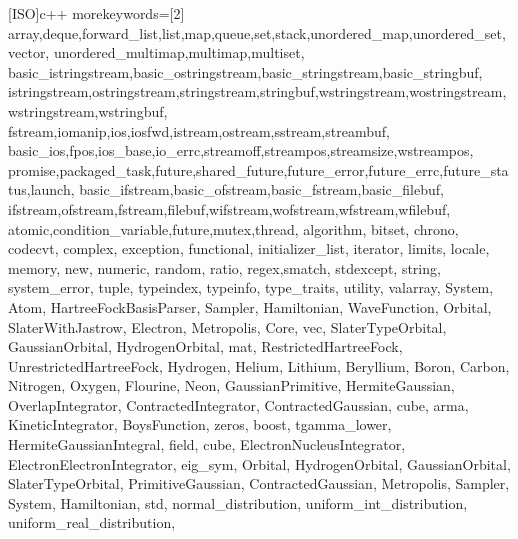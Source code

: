 [ISO]{c++}
{
    morekeywords=[2]{
        array,deque,forward_list,list,map,queue,set,stack,unordered_map,unordered_set,vector,
        unordered_multimap,multimap,multiset,
        basic_istringstream,basic_ostringstream,basic_stringstream,basic_stringbuf,
        istringstream,ostringstream,stringstream,stringbuf,wstringstream,wostringstream,wstringstream,wstringbuf,
        fstream,iomanip,ios,iosfwd,istream,ostream,sstream,streambuf,
        basic_ios,fpos,ios_base,io_errc,streamoff,streampos,streamsize,wstreampos,
        promise,packaged_task,future,shared_future,future_error,future_errc,future_status,launch,
        basic_ifstream,basic_ofstream,basic_fstream,basic_filebuf,
        ifstream,ofstream,fstream,filebuf,wifstream,wofstream,wfstream,wfilebuf,
        atomic,condition_variable,future,mutex,thread,
        algorithm,
        bitset,
        chrono,
        codecvt,
        complex,
        exception,
        functional,
        initializer_list,
        iterator,
        limits,
        locale,
        memory,
        new,
        numeric,
        random,
        ratio,
        regex,smatch,
        stdexcept,
        string,
        system_error,
        tuple,
        typeindex,
        typeinfo,
        type_traits,
        utility,
        valarray,
        System,
        Atom,
        HartreeFockBasisParser,
        Sampler,
        Hamiltonian,
        WaveFunction,
        Orbital,
        SlaterWithJastrow,
        Electron,
        Metropolis,
        Core,
        vec,
        SlaterTypeOrbital,
        GaussianOrbital,
        HydrogenOrbital,
        mat,
        RestrictedHartreeFock,
        UnrestrictedHartreeFock,
        Hydrogen,
        Helium,
        Lithium,
        Beryllium,
        Boron,
        Carbon,
        Nitrogen,
        Oxygen,
        Flourine,
        Neon,
        GaussianPrimitive,
        HermiteGaussian,
        OverlapIntegrator,
        ContractedIntegrator,
        ContractedGaussian,
        cube,
        arma,
        KineticIntegrator,
        BoysFunction,
        zeros,
        boost,
        tgamma_lower,
        HermiteGaussianIntegral,
        field,
        cube,
        ElectronNucleusIntegrator,
        ElectronElectronIntegrator,
        eig_sym,
        Orbital,
        HydrogenOrbital,
        GaussianOrbital,
        SlaterTypeOrbital,
        PrimitiveGaussian,
        ContractedGaussian,
        Metropolis,
        Sampler,
        System,
        Hamiltonian,
        std,
        normal_distribution,
        uniform_int_distribution,
        uniform_real_distribution,
}}
